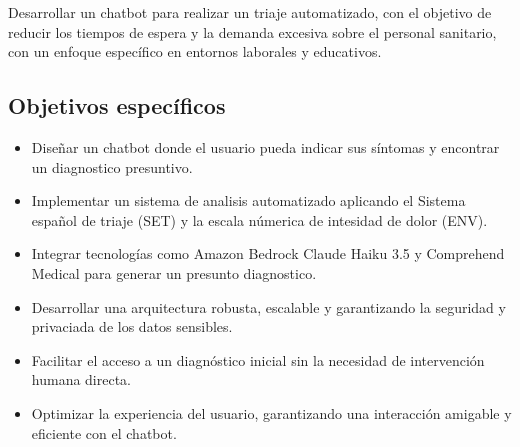 Desarrollar un chatbot para realizar un triaje automatizado, con el objetivo de reducir los tiempos de espera y la demanda excesiva sobre el personal sanitario, con un enfoque específico en entornos laborales y educativos.

\subsection{Objetivos específicos}

\begin{itemize}
    \item Diseñar un chatbot donde el usuario pueda indicar sus síntomas y encontrar un diagnostico presuntivo.
    \item Implementar un sistema de analisis automatizado aplicando el Sistema español de triaje (SET) y la escala númerica de intesidad de dolor (ENV).
    \item Integrar tecnologías como Amazon Bedrock Claude Haiku 3.5 y Comprehend Medical para generar un presunto diagnostico.
    \item Desarrollar una arquitectura robusta, escalable y garantizando la seguridad y privaciada de los datos sensibles.
    \item Facilitar el acceso a un diagnóstico inicial sin la necesidad de intervención humana directa.
    \item Optimizar la experiencia del usuario, garantizando una interacción amigable y eficiente con el chatbot.
\end{itemize}